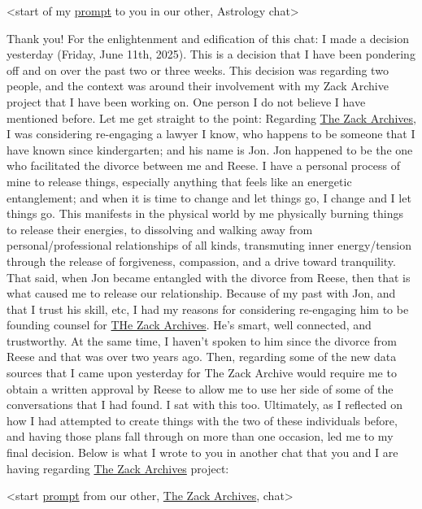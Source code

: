 \documentclass{article}
\begin{document}
\textless start of my \hyperlink{gloss:prompt}{prompt} to you in our other, Astrology chat\textgreater{}

Thank you! For the enlightenment and edification of this chat: I made a decision yesterday (Friday, June 11th, 2025). This is a decision that I have been pondering off and on over the past two or three weeks. This decision was regarding two people, and the context was around their involvement with my Zack Archive project that I have been working on. One person I do not believe I have mentioned before. Let me get straight to the point: Regarding \hyperlink{gloss:the_zack_archives}{The Zack Archives}, I was considering re-engaging a lawyer I know, who happens to be someone that I have known since kindergarten; and his name is Jon. Jon happened to be the one who facilitated the divorce between me and Reese. I have a personal process of mine to release things, especially anything that feels like an energetic entanglement; and when it is time to change and let things go, I change and I let things go. This manifests in the physical world by me physically burning things to release their energies, to dissolving and walking away from personal/professional relationships of all kinds, transmuting inner energy/tension through the release of forgiveness, compassion, and a drive toward tranquility. That said, when Jon became entangled with the divorce from Reese, then that is what caused me to release our relationship. Because of my past with Jon, and that I trust his skill, etc, I had my reasons for considering re-engaging him to be founding counsel for \hyperlink{gloss:the_zack_archives}{THe Zack Archives}. He's smart, well connected, and trustworthy. At the same time, I haven't spoken to him since the divorce from Reese and that was over two years ago. Then, regarding some of the new data sources that I came upon yesterday for The Zack Archive would require me to obtain a written approval by Reese to allow me to use her side of some of the conversations that I had found. I sat with this too. Ultimately, as I reflected on how I had attempted to create things with the two of these individuals before, and having those plans fall through on more than one occasion, led me to my final decision. Below is what I wrote to you in another chat that you and I are having regarding \hyperlink{gloss:the_zack_archives}{The Zack Archives} project:

\textless start \hyperlink{gloss:prompt}{prompt} from our other, \hyperlink{gloss:the_zack_archives}{The Zack Archives}, chat\textgreater{}
\end{document}
